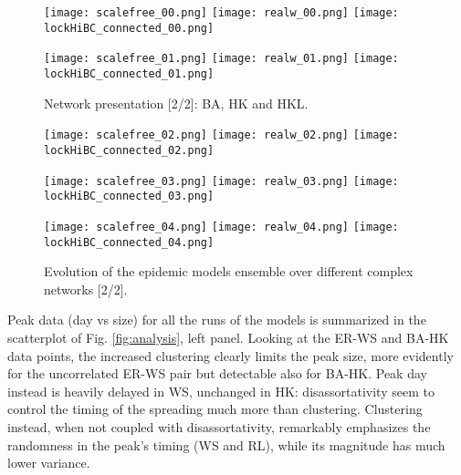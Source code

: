 \documentclass[DIV=12, BCOR=0pt]{scrartcl}  %
\begin{document}
  
  
  \clearpage
  
  \begin{figure}[h!]
  	\centering
  	\texttt{[image: scalefree\_00.png]}
  	\texttt{[image: realw\_00.png]}
  	\texttt{[image: lockHiBC\_connected\_00.png]}
  	
  	\texttt{[image: scalefree\_01.png]}
  	\texttt{[image: realw\_01.png]}
  	\texttt{[image: lockHiBC\_connected\_01.png]}
  	\caption{Network presentation [2/2]: BA, HK and HKL.}
  	\label{fig:networks1}
  \end{figure}  	
  
  \begin{figure}[h!]
  	\centering 
  	
  	\texttt{[image: scalefree\_02.png]}
  	\texttt{[image: realw\_02.png]}
  	\texttt{[image: lockHiBC\_connected\_02.png]}
  	
  	\texttt{[image: scalefree\_03.png]}
  	\texttt{[image: realw\_03.png]}
  	\texttt{[image: lockHiBC\_connected\_03.png]}
  	
  	\texttt{[image: scalefree\_04.png]}
  	\texttt{[image: realw\_04.png]}
  	\texttt{[image: lockHiBC\_connected\_04.png]}
  	
  	\caption{Evolution of the epidemic models ensemble over different complex networks [2/2].}
  	\label{fig:outcomes1}
  \end{figure}
  \clearpage
 
  
  Peak data (day vs size) for all the runs of the models is summarized in the scatterplot of Fig. \ref{fig:analysis}, left panel. Looking at the ER-WS and BA-HK data points, the increased clustering clearly limits the peak size, more evidently for the uncorrelated ER-WS pair but detectable also for BA-HK. Peak day instead is heavily delayed in WS, unchanged in HK: disassortativity seem to control the timing of the spreading much more than clustering. Clustering instead, when not coupled with disassortativity, remarkably emphasizes the randomness in the peak's timing (WS and RL), while its magnitude has much lower variance.
  
\end{document}
